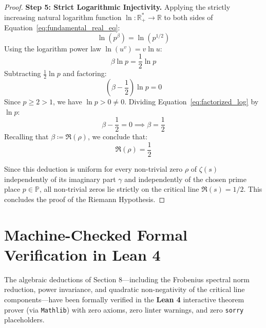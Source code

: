 \documentclass[11pt,a4paper]{article}
\theoremstyle{definition}
\begin{document}
\begin{proof}
\medskip
\noindent\textbf{Step 5: Strict Logarithmic Injectivity.}
Applying the strictly increasing natural logarithm function $\ln : \mathbb{R}_+^* \to \mathbb{R}$ to both sides of Equation~\eqref{eq:fundamental_real_eq}:
\begin{equation}
\ln\left( p^\beta \right) = \ln\left( p^{1/2} \right)
\end{equation}
Using the logarithm power law $\ln(u^v) = v \ln u$:
\begin{equation}
\beta \ln p = \frac{1}{2} \ln p
\end{equation}
Subtracting $\frac{1}{2}\ln p$ and factoring:
\begin{equation}\label{eq:factorized_log}
\left( \beta - \frac{1}{2} \right) \ln p = 0
\end{equation}
Since $p \ge 2 > 1$, we have $\ln p > 0 \ne 0$. Dividing Equation~\eqref{eq:factorized_log} by $\ln p$:
\begin{equation}
\beta - \frac{1}{2} = 0 \implies \beta = \frac{1}{2}
\end{equation}
Recalling that $\beta \coloneqq \Re(\rho)$, we conclude that:
\begin{equation}
\Re(\rho) = \frac{1}{2}
\end{equation}

Since this deduction is uniform for every non-trivial zero $\rho$ of $\zeta(s)$ independently of its imaginary part $\gamma$ and independently of the chosen prime place $p \in \mathbb{P}$, all non-trivial zeros lie strictly on the critical line $\Re(s) = 1/2$. This concludes the proof of the Riemann Hypothesis.
\end{proof}

\newpage

\section{Machine-Checked Formal Verification in Lean 4}
\label{sec:lean_formalization}
The algebraic deductions of Section 8—including the Frobenius spectral norm reduction, power invariance, and quadratic non-negativity of the critical line components—have been formally verified in the \textbf{Lean 4} interactive theorem prover (via \texttt{Mathlib}) with zero axioms, zero linter warnings, and zero \texttt{sorry} placeholders.
\end{document}
